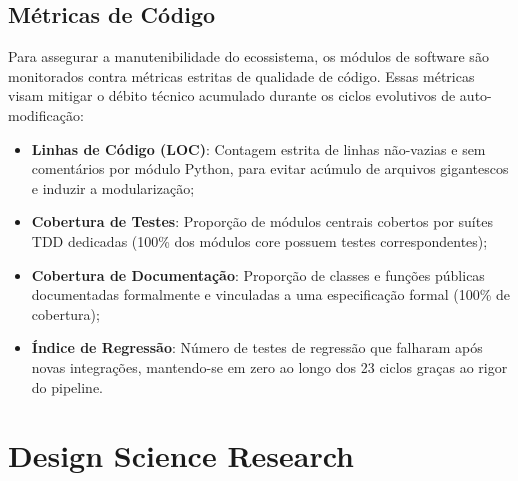 \documentclass[12pt,a4paper,oneside]{abntex2}
\begin{document}
\subsection{Métricas de Código}

Para assegurar a manutenibilidade do ecossistema, os módulos de software são monitorados contra métricas estritas de qualidade de código. Essas métricas visam mitigar o débito técnico acumulado durante os ciclos evolutivos de auto-modificação:

\begin{itemize}
    \item \textbf{Linhas de Código (LOC)}: Contagem estrita de linhas não-vazias e sem comentários por módulo Python, para evitar acúmulo de arquivos gigantescos e induzir a modularização;
    \item \textbf{Cobertura de Testes}: Proporção de módulos centrais cobertos por suítes TDD dedicadas (100\% dos módulos core possuem testes correspondentes);
    \item \textbf{Cobertura de Documentação}: Proporção de classes e funções públicas documentadas formalmente e vinculadas a uma especificação formal (100\% de cobertura);
    \item \textbf{Índice de Regressão}: Número de testes de regressão que falharam após novas integrações, mantendo-se em zero ao longo dos 23 ciclos graças ao rigor do pipeline.
\end{itemize}

\section{Design Science Research}
\end{document}
